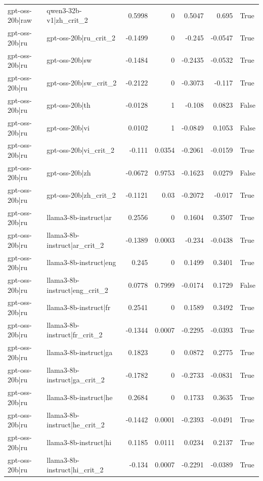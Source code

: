 \begin{table}
\begin{tabular}{l l r r r r l}
gpt-oss-20b|raw & qwen3-32b-v1|zh_crit_2 & 0.5998 & 0 & 0.5047 & 0.695 & True \\
gpt-oss-20b|ru & gpt-oss-20b|ru_crit_2 & -0.1499 & 0 & -0.245 & -0.0547 & True \\
gpt-oss-20b|ru & gpt-oss-20b|sw & -0.1484 & 0 & -0.2435 & -0.0532 & True \\
gpt-oss-20b|ru & gpt-oss-20b|sw_crit_2 & -0.2122 & 0 & -0.3073 & -0.117 & True \\
gpt-oss-20b|ru & gpt-oss-20b|th & -0.0128 & 1 & -0.108 & 0.0823 & False \\
gpt-oss-20b|ru & gpt-oss-20b|vi & 0.0102 & 1 & -0.0849 & 0.1053 & False \\
gpt-oss-20b|ru & gpt-oss-20b|vi_crit_2 & -0.111 & 0.0354 & -0.2061 & -0.0159 & True \\
gpt-oss-20b|ru & gpt-oss-20b|zh & -0.0672 & 0.9753 & -0.1623 & 0.0279 & False \\
gpt-oss-20b|ru & gpt-oss-20b|zh_crit_2 & -0.1121 & 0.03 & -0.2072 & -0.017 & True \\
gpt-oss-20b|ru & llama3-8b-instruct|ar & 0.2556 & 0 & 0.1604 & 0.3507 & True \\
gpt-oss-20b|ru & llama3-8b-instruct|ar_crit_2 & -0.1389 & 0.0003 & -0.234 & -0.0438 & True \\
gpt-oss-20b|ru & llama3-8b-instruct|eng & 0.245 & 0 & 0.1499 & 0.3401 & True \\
gpt-oss-20b|ru & llama3-8b-instruct|eng_crit_2 & 0.0778 & 0.7999 & -0.0174 & 0.1729 & False \\
gpt-oss-20b|ru & llama3-8b-instruct|fr & 0.2541 & 0 & 0.1589 & 0.3492 & True \\
gpt-oss-20b|ru & llama3-8b-instruct|fr_crit_2 & -0.1344 & 0.0007 & -0.2295 & -0.0393 & True \\
gpt-oss-20b|ru & llama3-8b-instruct|ga & 0.1823 & 0 & 0.0872 & 0.2775 & True \\
gpt-oss-20b|ru & llama3-8b-instruct|ga_crit_2 & -0.1782 & 0 & -0.2733 & -0.0831 & True \\
gpt-oss-20b|ru & llama3-8b-instruct|he & 0.2684 & 0 & 0.1733 & 0.3635 & True \\
gpt-oss-20b|ru & llama3-8b-instruct|he_crit_2 & -0.1442 & 0.0001 & -0.2393 & -0.0491 & True \\
gpt-oss-20b|ru & llama3-8b-instruct|hi & 0.1185 & 0.0111 & 0.0234 & 0.2137 & True \\
gpt-oss-20b|ru & llama3-8b-instruct|hi_crit_2 & -0.134 & 0.0007 & -0.2291 & -0.0389 & True \\

\end{tabular}
\end{table}
